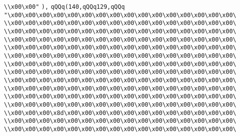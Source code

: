 \verb|\\x00\x00"|\newline
\verb|),|\newline
\verb|qQQq(140,qQQq129,qQQq|\newline
\verb|"\x00\x00\x00\x00\x00\x00\x00\x00\x00\x00\x00\x00\x00\x00\x00\x00\|\newline
\verb|\\x00\x00\x00\x00\x00\x00\x00\x00\x00\x00\x00\x00\x00\x00\x00\x00\|\newline
\verb|\\x00\x00\x00\x00\x00\x00\x00\x00\x00\x00\x00\x00\x00\x00\x00\x00\|\newline
\verb|\\x00\x00\x00\x00\x00\x00\x00\x00\x00\x00\x00\x00\x00\x00\x00\x00\|\newline
\verb|\\x00\x00\x00\x00\x00\x00\x00\x00\x00\x00\x00\x00\x00\x00\x00\x00\|\newline
\verb|\\x00\x00\x00\x00\x00\x00\x00\x00\x00\x00\x00\x00\x00\x00\x00\x00\|\newline
\verb|\\x00\x00\x00\x00\x00\x00\x00\x00\x00\x00\x00\x00\x00\x00\x00\x00\|\newline
\verb|\\x00\x00\x00\x00\x00\x00\x00\x00\x00\x00\x00\x00\x00\x00\x00\x00\|\newline
\verb|\\x00\x00\x00\x00\x00\x00\x00\x00\x00\x00\x00\x00\x00\x00\x00\x00\|\newline
\verb|\\x00\x00\x00\x00\x00\x00\x00\x00\x00\x00\x00\x00\x00\x00\x00\x00\|\newline
\verb|\\x00\x00\x00\x00\x00\x00\x00\x00\x00\x00\x00\x00\x00\x00\x00\x00\|\newline
\verb|\\x00\x00\x00\x00\x00\x00\x00\x00\x00\x00\x00\x00\x00\x00\x00\x00\|\newline
\verb|\\x00\x00\x00\x8d\x00\x00\x00\x00\x00\x00\x00\x00\x00\x00\x00\x00\|\newline
\verb|\\x00\x00\x00\x00\x00\x00\x00\x00\x00\x00\x00\x00\x00\x00\x00\x00\|\newline
\verb|\\x00\x00\x00\x00\x00\x00\x00\x00\x00\x00\x00\x00\x00\x00\x00\x00\|\newline
